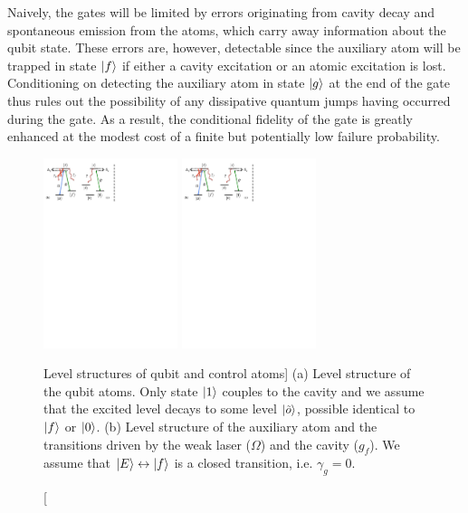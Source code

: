 Naively, the gates will be limited by errors originating from cavity decay and
spontaneous emission from the atoms, which carry away information about the
qubit state. These errors are, however, detectable since the auxiliary atom will
be trapped in state $| f \rangle$ if either a cavity excitation or an atomic
excitation is lost. Conditioning on detecting the auxiliary atom in state
$| g \rangle$ at the end of the gate thus rules out the possibility of any
dissipative quantum jumps having occurred during the gate. As a result, the
conditional fidelity of the gate is greatly enhanced at the modest cost of a
finite but potentially low failure probability.
\begin{figure}
\centering
\includegraphics[width=0.35\textwidth]{./figs_Borregaard_PRL2015/figure1a} 
\includegraphics[width=0.35\textwidth]{./figs_Borregaard_PRL2015/figure1b}
\caption
[Level structures of qubit and control atoms]
{(a) Level structure of the qubit atoms. Only state $| 1 \rangle$ couples to
the cavity and we assume that the excited level decays to some level
$| \tilde{o} \rangle$, possible identical to $| f \rangle$ or $| 0 \rangle$. (b) Level
structure of the auxiliary atom and the transitions driven by the weak laser
($\Omega$) and the cavity ($g_{f}$). We assume that
$| E \rangle\leftrightarrow| f \rangle$ is a closed transition, i.e. $\gamma_{g}=0$.  }
\label{fig:levels}
\end{figure}


